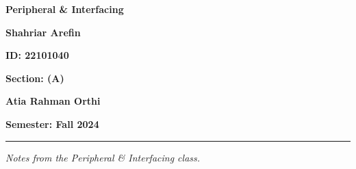 \begin{titlepage}
   \centering
   \vspace*{1.5cm}
   
   {\Huge {}\par}
   {\Huge\bfseries Peripheral \& Interfacing\par}
   \vspace{1.5cm}
   
   {\LARGE {}\par}
   {\LARGE\textbf{Shahriar Arefin}\par}
   \vspace{0.5cm}
   {\large\textbf{ID: 22101040}\par}
   \vspace{0.5cm}
   {\large\textbf{Section: (A)}\par}

   \vspace{1cm}
   {\LARGE {}\par}
   {\LARGE\textbf{Atia Rahman Orthi}\par}
   \vfill

   {\large\textbf{Semester: Fall 2024}\par}
   \vspace{1cm}

   \hrule \vspace{0.2cm}
   {\small \textit{Notes from the Peripheral \& Interfacing class.}}
\end{titlepage}
